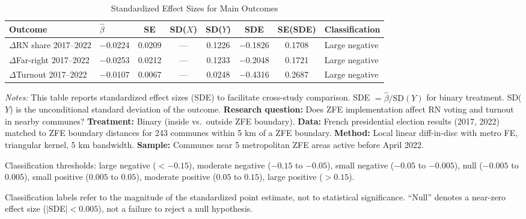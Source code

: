 \begin{table}[H]
\centering
\caption{Standardized Effect Sizes for Main Outcomes}
\label{tab:sde}
\small
\begin{adjustbox}{max width=\textwidth}
\begin{tabular}{llcccccl}
\toprule
Outcome & $\hat{\beta}$ & SE & SD($X$) & SD($Y$) & SDE & SE(SDE) & Classification \\
\midrule
  $\Delta$RN share 2017--2022 & $-$0.0224 & 0.0209 & --- & 0.1226 & $-$0.1826 & 0.1708 & Large negative \\
  $\Delta$Far-right 2017--2022 & $-$0.0253 & 0.0212 & --- & 0.1233 & $-$0.2048 & 0.1721 & Large negative \\
  $\Delta$Turnout 2017--2022 & $-$0.0107 & 0.0067 & --- & 0.0248 & $-$0.4316 & 0.2687 & Large negative \\
\bottomrule
\end{tabular}
\end{adjustbox}
\par\vspace{0.3em}
{\footnotesize \emph{Notes:} This table reports standardized effect sizes (SDE) to facilitate cross-study comparison. SDE $= \hat{\beta} / \text{SD}(Y)$ for binary treatment. SD($Y$) is the unconditional standard deviation of the outcome. \textbf{Research question:} Does ZFE implementation affect RN voting and turnout in nearby communes? \textbf{Treatment:} Binary (inside vs.\ outside ZFE boundary). \textbf{Data:} French presidential election results (2017, 2022) matched to ZFE boundary distances for 243 communes within 5 km of a ZFE boundary. \textbf{Method:} Local linear diff-in-disc with metro FE, triangular kernel, 5 km bandwidth. \textbf{Sample:} Communes near 5 metropolitan ZFE areas active before April 2022.

Classification thresholds: large negative ($< -0.15$), moderate negative ($-0.15$ to $-0.05$), small negative ($-0.05$ to $-0.005$), null ($-0.005$ to $0.005$), small positive ($0.005$ to $0.05$), moderate positive ($0.05$ to $0.15$), large positive ($> 0.15$).

Classification labels refer to the magnitude of the standardized point estimate, not to statistical significance. ``Null'' denotes a near-zero effect size ($|$SDE$| < 0.005$), not a failure to reject a null hypothesis.}
\end{table}
